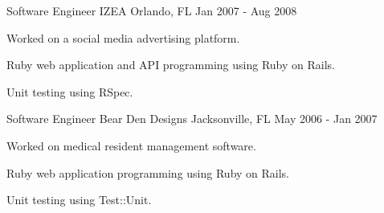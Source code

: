 \begin{cventries}
  \cventry
    {Software Engineer} %
    {IZEA} %
    {Orlando, FL} %
    {Jan 2007 - Aug 2008} %
    {
      \begin{cvitems} %
        \item {Worked on a social media advertising platform.}
        \item {Ruby web application and API programming using Ruby on Rails.}
        \item {Unit testing using RSpec.}
      \end{cvitems}
    }

  \cventry
    {Software Engineer} %
    {Bear Den Designs} %
    {Jacksonville, FL} %
    {May 2006 - Jan 2007} %
    {
      \begin{cvitems} %
        \item {Worked on medical resident management software.}
        \item {Ruby web application programming using Ruby on Rails.}
        \item {Unit testing using Test::Unit.}
      \end{cvitems}
    }

\end{cventries}

